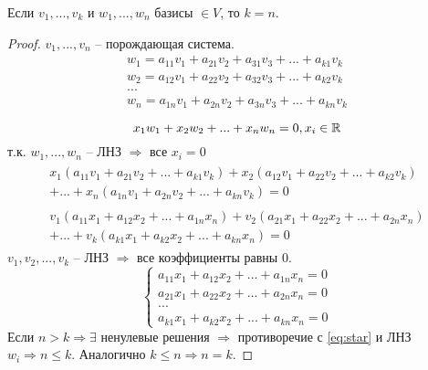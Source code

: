 \begin{theorem}
    Если $v_1, ..., v_k$ и $w_1, ...,w_n$ базисы $\in V$, то $k=n$.
\end{theorem}
\begin{proof}
    $v_1, ..., v_n$ -- порождающая система.
    \begin{gather*}
        w_1 = a_{11} v_1 + a_{21} v_2  + a_{31} v_3 + ... + a_{k1} v_k \\
        w_2 = a_{12} v_1 + a_{22} v_2  + a_{32} v_3 + ... + a_{k2} v_k \\
        ...                                                            \\
        w_n = a_{1n} v_1 + a_{2n} v_2  + a_{3n} v_3 + ... + a_{kn} v_k \\
    \end{gather*}
    \begin{equation}\label{eq:star}
        x_1 w_1 + x_2 w_2 + ... + x_n w_n = 0, x_i \in \mathbb{R}
    \end{equation}
    т.к. $w_1, ..., w_n$ -- ЛНЗ $\Rightarrow$ все $x_i=0$
    \begin{gather*}
        \begin{multlined}
            x_1 (a_{11} v_1 + a_{21} v_2 + ... + a_{k1} v_k) +
            x_2 (a_{12} v_1 + a_{22} v_2 + ... + a_{k2} v_k) \\
            + ... +
            x_n (a_{1n} v_1 + a_{2n} v_2 + ... + a_{kn} v_k) = 0
        \end{multlined}\\
        \begin{multlined}
            v_1 (a_{11} x_1 + a_{12} x_2 + ... + a_{1n} x_n ) +
            v_2 (a_{21} x_1 + a_{22} x_2 + ... + a_{2n} x_n ) \\
            + ... +
            v_k (a_{k1} x_1 + a_{k2} x_2 + ... + a_{kn} x_n ) = 0
        \end{multlined}
    \end{gather*}
    $v_1, v_2, ..., v_k$ -- ЛНЗ $\Rightarrow$ все коэффициенты равны 0.
    \[\begin{cases}
            a_{11} x_1 + a_{12} x_2 + ... + a_{1n}x_n = 0 \\
            a_{21} x_1 + a_{22} x_2 + ... + a_{2n}x_n = 0 \\
            ...                                           \\
            a_{k1} x_1 + a_{k2} x_2 + ... + a_{kn}x_n = 0
        \end{cases}\]
    Если $n>k \Rightarrow \exists$ ненулевые решения $\Rightarrow$ противоречие
    с \eqref{eq:star} и ЛНЗ $w_i \Rightarrow n \le k$. Аналогично $k \le n \Rightarrow n=k$. 
\end{proof}